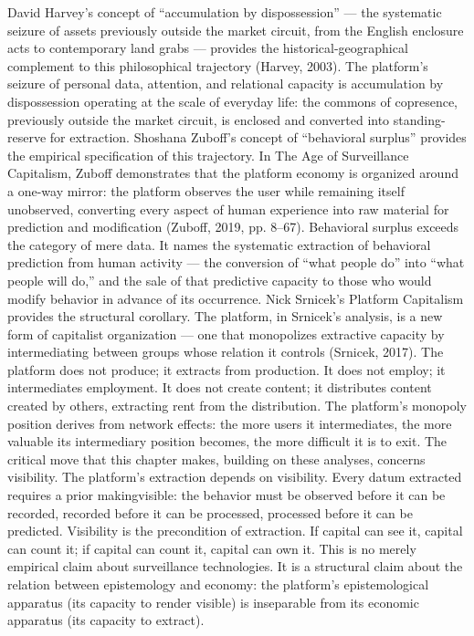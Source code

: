 David Harvey’s concept of “accumulation by dispossession” — the systematic seizure of assets previously outside the market circuit, from the English enclosure acts to contemporary land grabs — provides the historical-geographical complement to this philosophical trajectory (Harvey, 2003). The platform’s seizure of personal data, attention, and relational capacity is accumulation by dispossession operating at the scale of everyday life: the commons of copresence, previously outside the market circuit, is enclosed and converted into standing-reserve for extraction. Shoshana Zuboff’s concept of “behavioral surplus” provides the empirical specification of this trajectory. In The Age of Surveillance Capitalism, Zuboff demonstrates that the platform economy is organized around a one-way mirror: the platform observes the user while remaining itself unobserved, converting every aspect of human experience into raw material for prediction and modification (Zuboff, 2019, pp. 8–67). Behavioral surplus exceeds the category of mere data. It names the systematic extraction of behavioral prediction from human activity — the conversion of “what people do” into “what people will do,” and the sale of that predictive capacity to those who would modify behavior in advance of its occurrence. Nick Srnicek’s Platform Capitalism provides the structural corollary. The platform, in Srnicek’s analysis, is a new form of capitalist organization — one that monopolizes extractive capacity by intermediating between groups whose relation it controls (Srnicek, 2017). The platform does not produce; it extracts from production. It does not employ; it intermediates employment. It does not create content; it distributes content created by others, extracting rent from the distribution. The platform’s monopoly position derives from network effects: the more users it intermediates, the more valuable its intermediary position becomes, the more difficult it is to exit. The critical move that this chapter makes, building on these analyses, concerns visibility. The platform’s extraction depends on visibility. Every datum extracted requires a prior makingvisible: the behavior must be observed before it can be recorded, recorded before it can be processed, processed before it can be predicted. Visibility is the precondition of extraction. If capital can see it, capital can count it; if capital can count it, capital can own it. This is no merely empirical claim about surveillance technologies. It is a structural claim about the relation between epistemology and economy: the platform’s epistemological apparatus (its capacity to render visible) is inseparable from its economic apparatus (its capacity to extract).

